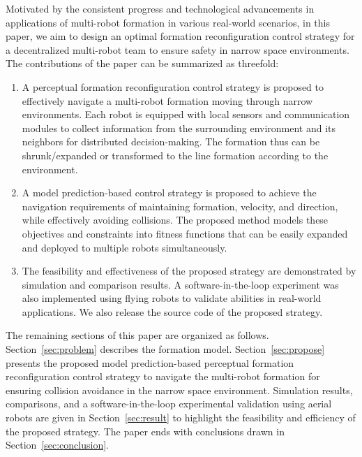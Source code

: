 Motivated by the consistent progress and technological advancements in applications of multi-robot formation in various real-world scenarios, in this paper, we aim to design an optimal formation reconfiguration control strategy for a decentralized multi-robot team to ensure safety in narrow space environments. The contributions of the paper can be summarized as threefold:
\begin{enumerate}
    \item A perceptual formation reconfiguration control strategy is proposed to effectively navigate a multi-robot formation moving through narrow environments. Each robot is equipped with local sensors and communication modules to collect information from the surrounding environment and its neighbors for distributed decision-making. The formation thus can be shrunk/expanded or transformed to the line formation according to the environment.
        \item A model prediction-based control strategy is proposed to achieve the navigation requirements of maintaining formation, velocity, and direction, while effectively avoiding collisions. The proposed method models these objectives and constraints into fitness functions that can be easily expanded and deployed to multiple robots simultaneously.
    \item The feasibility and effectiveness of the proposed strategy are demonstrated by simulation and comparison results. A software-in-the-loop experiment was also implemented using flying robots to validate abilities in real-world applications. We also release the source code of the proposed strategy.
\end{enumerate}

The remaining sections of this paper are organized as follows. Section~\ref{sec:problem} describes the formation model. Section~\ref{sec:propose} presents the proposed model prediction-based perceptual formation reconfiguration control strategy to navigate the multi-robot formation for ensuring collision avoidance in the narrow space environment. Simulation results, comparisons, and a software-in-the-loop experimental validation using aerial robots are given in Section~\ref{sec:result} to highlight the feasibility and efficiency of the proposed strategy. The paper ends with conclusions drawn in Section~\ref{sec:conclusion}.
